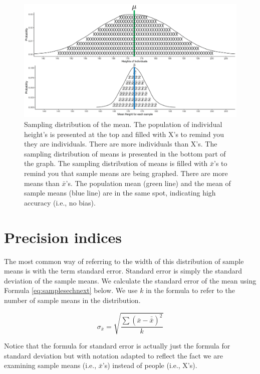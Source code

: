 \documentclass[
]{krantz}
\begin{document}
\begin{figure}
\includegraphics[width=0.8\linewidth]{ch_samples_precision/images/sampling_dist} \caption[Sampling distribution of the mean.]{Sampling distribution of the mean. The population of individual height's is presented at the top and filled with X's to remind you they are individuals. There are more individuals than X's. The sampling distribution of means is presented in the bottom part of the graph. The sampling distribution of means is filled with $\bar{x}$'s to remind you that sample means are being graphed. There are more means than $\bar{x}$'s. The population mean (green line) and the mean of sample means (blue line) are in the same spot, indicating high accuracy (i.e., no bias).}\label{fig:bothdist2}
\end{figure}

\hypertarget{precision-indices}{%
\section{Precision indices}\label{precision-indices}}

The most common way of referring to the width of this distribution of sample means is with the term standard error. Standard error is simply the standard deviation of the sample means. We calculate the standard error of the mean using Formula \eqref{eq:samplesechnext} below. We use \(k\) in the formula to refer to the number of sample means in the distribution.

\begin{equation} 
\sigma_{\bar{x}} = \sqrt{\frac{\sum{(\bar{x} - \bar{\bar{x}})^2}}{k}}
      \label{eq:samplesechnext}
\end{equation}

Notice that the formula for standard error is actually just the formula for standard deviation but with notation adapted to reflect the fact we are examining sample means (i.e., \(\bar{x}\)'s) instead of people (i.e., X's).
\end{document}
